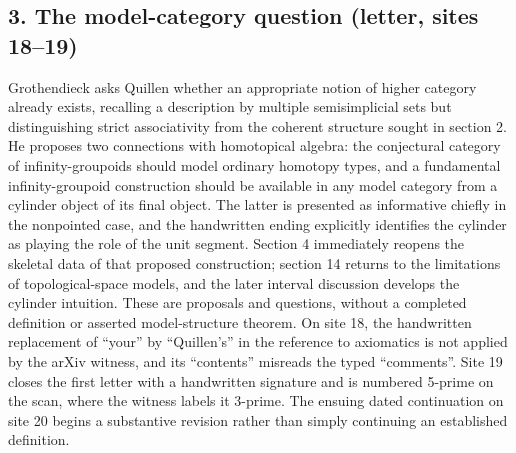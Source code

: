 \documentclass[10pt,oneside]{book}
\begin{document}
\subsection*{3. The model-category question (letter, sites 18--19)}
Grothendieck asks Quillen whether an appropriate notion of higher category already exists, recalling a description by multiple semisimplicial sets but distinguishing strict associativity from the coherent structure sought in section 2. He proposes two connections with homotopical algebra: the conjectural category of infinity-groupoids should model ordinary homotopy types, and a fundamental infinity-groupoid construction should be available in any model category from a cylinder object of its final object. The latter is presented as informative chiefly in the nonpointed case, and the handwritten ending explicitly identifies the cylinder as playing the role of the unit segment. Section 4 immediately reopens the skeletal data of that proposed construction; section 14 returns to the limitations of topological-space models, and the later interval discussion develops the cylinder intuition. These are proposals and questions, without a completed definition or asserted model-structure theorem. On site 18, the handwritten replacement of ``your'' by ``Quillen's'' in the reference to axiomatics is not applied by the arXiv witness, and its ``contents'' misreads the typed ``comments''. Site 19 closes the first letter with a handwritten signature and is numbered 5-prime on the scan, where the witness labels it 3-prime. The ensuing dated continuation on site 20 begins a substantive revision rather than simply continuing an established definition.
\end{document}
